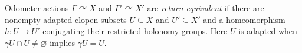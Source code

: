 
Odometer actions $\Gamma\curvearrowright X$ and $\Gamma'\curvearrowright X'$ are \emph{return equivalent} if there are nonempty adapted clopen subsets $U\subseteq X$ and $U'\subseteq X'$ and a homeomorphism $h:U\to U'$ conjugating their restricted holonomy groups. Here $U$ is adapted when $\gamma U\cap U\ne\varnothing$ implies $\gamma U=U$.
